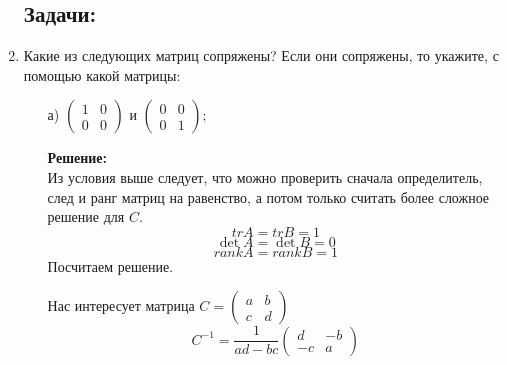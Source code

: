 \documentclass[a4paper,12pt]{article}
\newcounter{z}
\begin{document}
\begin{enumerate}

\subsection*{Задачи:}




\item Какие из следующих матриц сопряжены? Если они сопряжены, то укажите, с помощью какой матрицы:
\begin{itemize}
\item[а)] $\begin{pmatrix}{1}&{0}\\{0}&{0}\end{pmatrix}$ и $\begin{pmatrix}{0}&{0}\\{0}&{1}\end{pmatrix};$

\textbf{Решение:}\\
Из условия выше следует, что можно проверить сначала определитель, след и ранг матриц на равенство, а потом только считать более сложное решение для $C$.
$$tr A = tr B = 1$$ 
$$\det A = \det B = 0$$
$$ rank A = rank B = 1$$
Посчитаем решение.

Нас интересует матрица $C=\begin{pmatrix}{a}&{b}\\{c}&{d}\end{pmatrix}$
$$C^{-1}=\frac{1}{ad-bc}\begin{pmatrix}{d}&{-b}\\{-c}&{a}\end{pmatrix}$$


\end{itemize}
\end{enumerate}
\end{document}
